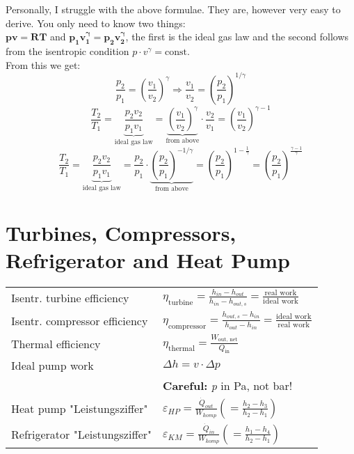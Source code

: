 Personally, I struggle with the above formulae. They are, however very easy to derive. You only need to know two things: \\
$\mathbf{ pv = RT }$ and $ \mathbf{ p_1 v_1^\gamma = p_2 v_2^\gamma }$, the first is the ideal gas law and the second follows from the isentropic condition $p\cdot v^\gamma = \text{const.}$ \\
From this we get: 
	$$\frac{p_2}{p_1} = \left( \frac{v_1}{v_2} \right)^\gamma  \Rightarrow \frac{v_1}{v_2} = \left( \frac{p_2}{p_1} \right)^{1/\gamma}$$
	$$ \frac{T_2}{T_1} = \underbrace{ \frac{p_2 v_2}{p_1 v_1}}_{\text{ideal gas law}} = \underbrace{\left( \frac{v_1}{v_2} \right)^\gamma}_{\text{from above}} \cdot \frac{v_2}{v_1} = \left( \frac{v_1}{v_2} \right)^{\gamma -1} $$
	$$ \frac{T_2}{T_1} = \underbrace{ \frac{p_2 v_2}{p_1 v_1}}_{\text{ideal gas law}} = \frac{p_2}{p_1} \cdot \underbrace{ \left( \frac{p_2}{p_1} \right)^{-1/\gamma}}_{\text{from above}} = \left( \frac{p_2}{p_1} \right)^{1 - \frac{1}{\gamma}} = \left( \frac{p_2}{p_1} \right)^{\frac{\gamma -1}{\gamma}}$$

\section*{Turbines, Compressors, Refrigerator and Heat Pump}
    \begin{tabular}{ m{5cm} l}
    Isentr. turbine efficiency & $\eta_{\text{turbine}} = \frac{h_{in} - h_{out}}{h_{in} - h_{out,s}} = \frac{\text{real work}}{\text{ideal work}} $ \\
    Isentr. compressor efficiency & $\eta_{\text{compressor}} = \frac{h_{out,s} - h_{in}}{h_{out} - h_{in}} = \frac{\text{ideal work}}{\text{real work}} $  \\
    Thermal efficiency & $\eta_{\text{thermal}} = \frac{W_{\text{out, net}}}{Q_{\text{in}}} $ \\
    Ideal pump work & $\Delta h = v \cdot \Delta p$ \\
    & \textbf{Careful:} \textit{p} in Pa, not bar! \\
    Heat pump "Leistungsziffer" & $\varepsilon_{HP} = \frac{\Dot{Q}_{out}}{W_{komp}} \left( = \frac{h_2 - h_3}{h_2 - h_1} \right) $ \\
    Refrigerator "Leistungsziffer" & $\varepsilon_{KM} = \frac{\Dot{Q}_{in}}{W_{komp}} \left( = \frac{h_1 - h_4}{h_2 - h_1} \right)$ \\
    \end{tabular}
    
